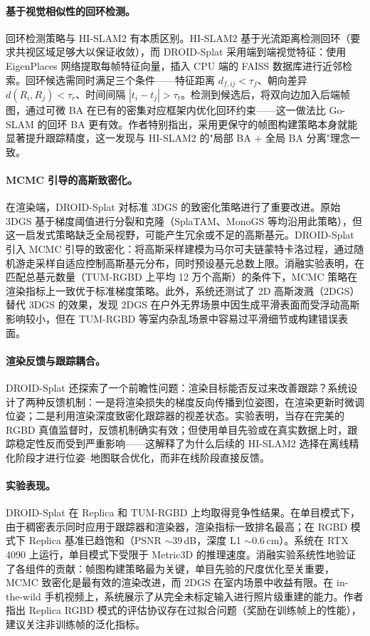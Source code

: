 \paragraph{基于视觉相似性的回环检测。}
回环检测策略与 HI-SLAM2 有本质区别。HI-SLAM2 基于光流距离检测回环（要求共视区域足够大以保证收敛），而 DROID-Splat 采用端到端视觉特征：使用 EigenPlaces 网络提取每帧特征向量，插入 CPU 端的 FAISS 数据库进行近邻检索。回环候选需同时满足三个条件——特征距离 $d_{f,ij} < \tau_f$、朝向差异 $d(R_i, R_j) < \tau_r$、时间间隔 $|t_i - t_j| > \tau_t$。检测到候选后，将双向边加入后端帧图，通过可微 BA 在已有的密集对应框架内优化回环约束——这一做法比 Go-SLAM 的回环 BA 更有效。作者特别指出，采用更保守的帧图构建策略本身就能显著提升跟踪精度，这一发现与 HI-SLAM2 的"局部 BA + 全局 BA 分离"理念一致。

\paragraph{MCMC 引导的高斯致密化。}
在渲染端，DROID-Splat 对标准 3DGS 的致密化策略进行了重要改进。原始 3DGS 基于梯度阈值进行分裂和克隆（SplaTAM、MonoGS 等均沿用此策略），但这一启发式策略缺乏全局视野，可能产生冗余或不足的高斯基元。DROID-Splat 引入 MCMC 引导的致密化：将高斯采样建模为马尔可夫链蒙特卡洛过程，通过随机游走采样自适应控制高斯基元分布，同时预设基元总数上限。消融实验表明，在匹配总基元数量（TUM-RGBD 上平均 12 万个高斯）的条件下，MCMC 策略在渲染指标上一致优于标准梯度策略。此外，系统还测试了 2D 高斯泼溅（2DGS）替代 3DGS 的效果，发现 2DGS 在户外无界场景中因生成平滑表面而受浮动高斯影响较小，但在 TUM-RGBD 等室内杂乱场景中容易过平滑细节或构建错误表面。

\paragraph{渲染反馈与跟踪耦合。}
DROID-Splat 还探索了一个前瞻性问题：渲染目标能否反过来改善跟踪？系统设计了两种反馈机制：一是将渲染损失的梯度反向传播到位姿图，在渲染更新时微调位姿；二是利用渲染深度致密化跟踪器的视差状态。实验表明，当存在完美的 RGBD 真值监督时，反馈机制确实有效；但使用单目先验或在真实数据上时，跟踪稳定性反而受到严重影响——这解释了为什么后续的 HI-SLAM2 选择在离线精化阶段才进行位姿--地图联合优化，而非在线阶段直接反馈。

\paragraph{实验表现。}
DROID-Splat 在 Replica 和 TUM-RGBD 上均取得竞争性结果。在单目模式下，由于稠密表示同时应用于跟踪器和渲染器，渲染指标一致排名最高；在 RGBD 模式下 Replica 基准已趋饱和（PSNR ${\sim}39$\,dB，深度 L1 ${\sim}0.6$\,cm）。系统在 RTX 4090 上运行，单目模式下受限于 Metric3D 的推理速度。消融实验系统性地验证了各组件的贡献：帧图构建策略最为关键，单目先验的尺度优化至关重要，MCMC 致密化是最有效的渲染改进，而 2DGS 在室内场景中收益有限。在 in-the-wild 手机视频上，系统展示了从完全未标定输入进行照片级重建的能力。作者指出 Replica RGBD 模式的评估协议存在过拟合问题（奖励在训练帧上的性能），建议关注非训练帧的泛化指标。

